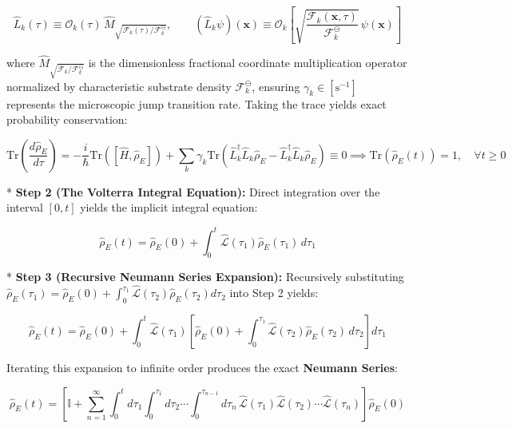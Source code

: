 \documentclass[11pt,a4paper]{article}
\theoremstyle{definition}\newtheorem{definition}{Definition}
\theoremstyle{remark}\newtheorem{remark}{Remark}
\begin{document}
\begin{equation}
\boxed{\hat{L}_k(\tau) \equiv \mathcal{O}_k(\tau) \, \hat{M}_{\sqrt{\mathcal{F}_k(\tau)/\mathcal{F}_k^\ominus}}, \qquad (\hat{L}_k \psi)(\mathbf{x}) \equiv \mathcal{O}_k \left[ \sqrt{\frac{\mathcal{F}_k(\mathbf{x}, \tau)}{\mathcal{F}_k^\ominus}} \, \psi(\mathbf{x}) \right]}
\end{equation}


where $\hat{M}_{\sqrt{\mathcal{F}_k/\mathcal{F}_k^\ominus}}$ is the dimensionless fractional coordinate multiplication operator normalized by characteristic substrate density $\mathcal{F}_k^\ominus$, ensuring $\gamma_k \in [ \mathrm{s}^{-1} ]$ represents the microscopic jump transition rate. Taking the trace yields exact probability conservation:


\begin{equation}
\mathrm{Tr} \left( \frac{d\hat{\rho}_E}{d\tau} \right) = -\frac{i}{\hbar} \mathrm{Tr} \left( [\hat{H}, \hat{\rho}_E] \right) + \sum_k \gamma_k \mathrm{Tr} \left( \hat{L}_k^\dagger \hat{L}_k \hat{\rho}_E - \hat{L}_k^\dagger \hat{L}_k \hat{\rho}_E \right) \equiv 0 \implies \mathrm{Tr}(\hat{\rho}_E(t)) = 1, \quad \forall t \ge 0
\end{equation}


* \textbf{Step 2 (The Volterra Integral Equation):}
Direct integration over the interval $[0, t]$ yields the implicit integral equation:


\begin{equation}
\hat{\rho}_E(t) = \hat{\rho}_E(0) + \int_0^t \hat{\mathcal{L}}(\tau_1) \hat{\rho}_E(\tau_1) \, d\tau_1
\end{equation}


* \textbf{Step 3 (Recursive Neumann Series Expansion):}
Recursively substituting $\hat{\rho}_E(\tau_1) = \hat{\rho}_E(0) + \int_0^{\tau_1} \hat{\mathcal{L}}(\tau_2) \hat{\rho}_E(\tau_2) d\tau_2$ into Step 2 yields:


\begin{equation}
\hat{\rho}_E(t) = \hat{\rho}_E(0) + \int_0^t \hat{\mathcal{L}}(\tau_1) [ \hat{\rho}_E(0) + \int_0^{\tau_1} \hat{\mathcal{L}}(\tau_2) \hat{\rho}_E(\tau_2) \, d\tau_2 ] d\tau_1
\end{equation}


Iterating this expansion to infinite order produces the exact \textbf{Neumann Series}:


\begin{equation}
\hat{\rho}_E(t) = [ \mathbb{I} + \sum_{n=1}^\infty \int_0^t d\tau_1 \int_0^{\tau_1} d\tau_2 \cdots \int_0^{\tau_{n-1}} d\tau_n \, \hat{\mathcal{L}}(\tau_1) \hat{\mathcal{L}}(\tau_2) \cdots \hat{\mathcal{L}}(\tau_n) ] \hat{\rho}_E(0)
\end{equation}
\end{document}
